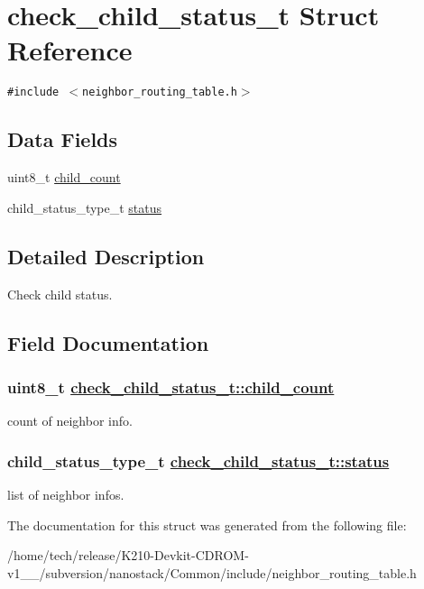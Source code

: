 \hypertarget{structcheck__child__status__t}{
\section{check\_\-child\_\-status\_\-t Struct Reference}
\label{structcheck__child__status__t}
}
{\tt \#include $<$neighbor\_\-routing\_\-table.h$>$}

\subsection*{Data Fields}
\begin{CompactItemize}
\item 
uint8\_\-t \hyperlink{structcheck__child__status__t_273e70667367e7de2e916e4d35ba4878}{child\_\-count}
\item 
child\_\-status\_\-type\_\-t \hyperlink{structcheck__child__status__t_a22d22014a852fcfc19eadfad9d6cbd8}{status}
\end{CompactItemize}


\subsection{Detailed Description}
Check child status. 



\subsection{Field Documentation}
\hypertarget{structcheck__child__status__t_273e70667367e7de2e916e4d35ba4878}{
\subsubsection[child\_\-count]{\setlength{\rightskip}{0pt plus 5cm}uint8\_\-t \hyperlink{structcheck__child__status__t_273e70667367e7de2e916e4d35ba4878}{check\_\-child\_\-status\_\-t::child\_\-count}}}
\label{structcheck__child__status__t_273e70667367e7de2e916e4d35ba4878}


count of neighbor info. \hypertarget{structcheck__child__status__t_a22d22014a852fcfc19eadfad9d6cbd8}{
\subsubsection[status]{\setlength{\rightskip}{0pt plus 5cm}child\_\-status\_\-type\_\-t \hyperlink{structcheck__child__status__t_a22d22014a852fcfc19eadfad9d6cbd8}{check\_\-child\_\-status\_\-t::status}}}
\label{structcheck__child__status__t_a22d22014a852fcfc19eadfad9d6cbd8}


list of neighbor infos. 

The documentation for this struct was generated from the following file:\begin{CompactItemize}
\item 
/home/tech/release/K210-Devkit-CDROM-v1\_\_/subversion/nanostack/Common/include/neighbor\_\-routing\_\-table.h\end{CompactItemize}
